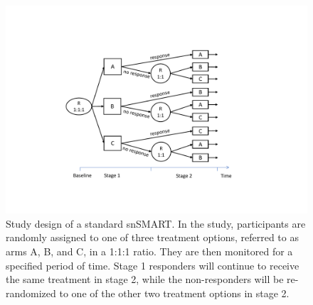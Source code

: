 \begin{figure}
\centerline{\includegraphics[width=12cm]{chapters/figures/standardsnSMART.pdf}}
\caption{Study design of a standard snSMART. In the study, participants are randomly assigned to one of three treatment options, referred to as arms A, B, and C, in a 1:1:1 ratio. They are then monitored for a specified period of time. Stage 1 responders will continue to receive the same treatment in stage 2, while the non-responders will be re-randomized to one of the other two treatment options in stage 2.}
\label{fig:standardsnSMART}
\end{figure}

